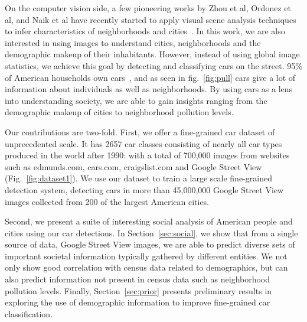 \documentclass[10pt,twocolumn,letterpaper]{article}
\begin{document}
On the computer vision side, a few pioneering works by Zhou et al, Ordonez et al, and Naik et al have recently started to apply visual scene analysis techniques to infer characteristics of neighborhoods and cities~\cite{antonio, mcdonalds, mit_cvpr,tamara}. In this work, we are also interested in using images to understand cities, neighborhoods and the demographic makeup of their inhabitants. However, instead of using global image statistics, we achieve this goal by detecting and classifying cars on the street. 95\% of American households own cars~\cite{car_stats}, and as seen in fig.~\ref{fig:pull} cars give a lot of information about individuals as well as neighborhoods. By using cars as a lens into understanding society, we are able to gain insights ranging from the demographic makeup of cities to neighborhood pollution levels.

Our contributions are two-fold. First, we offer a fine-grained car dataset of unprecedented scale. It has 2657 car classes consisting of nearly all car types produced in the world after 1990: with a total of 700,000 images from websites such as edmunds.com, cars.com, craigslist.com and Google Street View (Fig.~\ref{fig:dataset1}). We use our dataset to train a large scale fine-grained detection system, detecting cars in more than 45,000,000 Google Street View images collected from 200 of the largest American cities.

Second, we present a suite of interesting social analysis of American people and cities using our car detections. In Section~\ref{sec:social}, we show that from a single source of data, Google Street View images, we are able to predict diverse sets of important societal information typically gathered by different entities. We not only show good correlation with census data related to demographics, but can also predict information not present in census data such as neighborhood pollution levels. Finally, Section~\ref{sec:prior} presents preliminary results in exploring the use of demographic information to improve fine-grained car classification.
\end{document}
